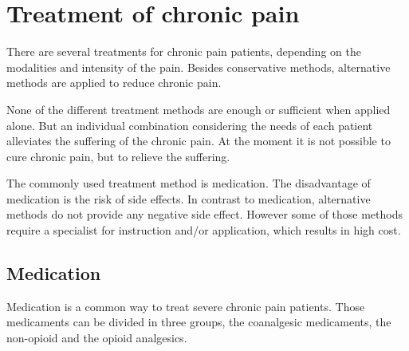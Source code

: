 

\section{Treatment of chronic pain} \label{sec:treatment}
There are several treatments for chronic pain patients, depending on the modalities and intensity of the pain. Besides conservative methods, alternative methods are applied to reduce chronic pain. %
\cite{marcus2009,pope2017}

None of the different treatment methods are enough or sufficient when applied alone. But an individual combination considering the needs of each patient alleviates the suffering of the chronic pain. At the moment it is not possible to cure chronic pain, but to relieve the suffering. \cite{marcus2009,pope2017} 

The commonly used treatment method is medication. The disadvantage of medication is the risk of side effects. In contrast to medication, alternative methods do not provide any negative side effect. However some of those methods require a specialist for instruction and/or application, which results in high cost. \cite{marcus2009,pope2017}

\subsection{Medication}
Medication is a common way to treat severe chronic pain patients. %
Those medicaments can be divided in three groups, the coanalgesic medicaments, the non-opioid and the opioid analgesics. \cite{marcus2009}

